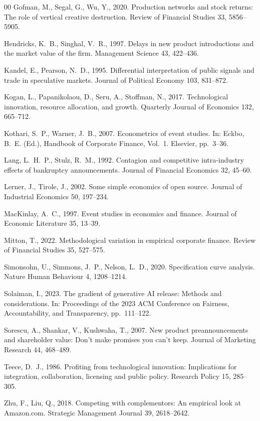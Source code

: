 \documentclass[review,12pt,authoryear]{elsarticle}
\begin{document}
\begin{thebibliography}{00}
Gofman, M., Segal, G., Wu, Y., 2020. Production networks and stock returns:
The role of vertical creative destruction. Review of Financial Studies 33,
5856--5905.

Hendricks, K.~B., Singhal, V.~R., 1997. Delays in new product introductions
and the market value of the firm. Management Science 43, 422--436.

Kandel, E., Pearson, N.~D., 1995. Differential interpretation of public
signals and trade in speculative markets. Journal of Political Economy 103,
831--872.

Kogan, L., Papanikolaou, D., Seru, A., Stoffman, N., 2017. Technological
innovation, resource allocation, and growth. Quarterly Journal of Economics
132, 665--712.

Kothari, S.~P., Warner, J.~B., 2007. Econometrics of event studies. In:
Eckbo, B.~E. (Ed.), Handbook of Corporate Finance, Vol.~1. Elsevier,
pp.~3--36.

Lang, L.~H.~P., Stulz, R.~M., 1992. Contagion and competitive intra-industry
effects of bankruptcy announcements. Journal of Financial Economics 32,
45--60.

Lerner, J., Tirole, J., 2002. Some simple economics of open source. Journal
of Industrial Economics 50, 197--234.

MacKinlay, A.~C., 1997. Event studies in economics and finance. Journal of
Economic Literature 35, 13--39.

Mitton, T., 2022. Methodological variation in empirical corporate finance.
Review of Financial Studies 35, 527--575.

Simonsohn, U., Simmons, J.~P., Nelson, L.~D., 2020. Specification curve
analysis. Nature Human Behaviour 4, 1208--1214.

Solaiman, I., 2023. The gradient of generative AI release: Methods and
considerations. In: Proceedings of the 2023 ACM Conference on Fairness,
Accountability, and Transparency, pp.~111--122.

Sorescu, A., Shankar, V., Kushwaha, T., 2007. New product preannouncements
and shareholder value: Don't make promises you can't keep. Journal of
Marketing Research 44, 468--489.

Teece, D.~J., 1986. Profiting from technological innovation: Implications for
integration, collaboration, licensing and public policy. Research Policy 15,
285--305.

Zhu, F., Liu, Q., 2018. Competing with complementors: An empirical look at
Amazon.com. Strategic Management Journal 39, 2618--2642.

\end{thebibliography}
\end{document}
